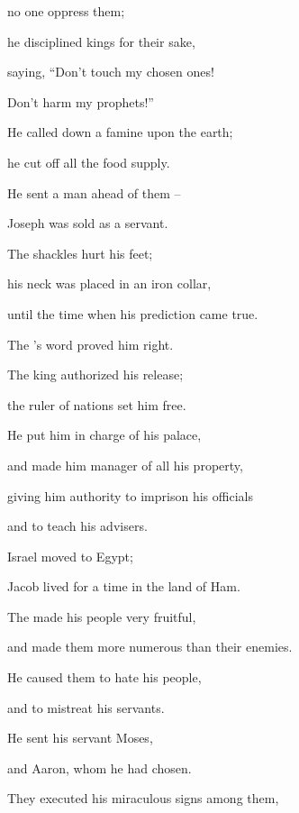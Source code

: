 {no
one
oppress
them;
\par }{\Q he disciplined
kings
for their sake,
\par }{\Q {}saying, “Don’t
touch
my chosen ones!
\par }{\Q Don’t
harm
my prophets!”
\par }{\Q {}He called
down a famine
upon
the earth;
\par }{\Q he cut off
all
the food
supply.
\par }{\Q {}He sent
a man
ahead of them –
\par }{\Q Joseph was sold as a servant.
\par }{\Q {}The shackles
hurt
his feet;
\par }{\Q his neck was placed
in an iron
collar,
\par }{\Q {}until
the time
when his prediction
came
true.
\par }{\Q The
{}’s
word
proved him right.
\par }{\Q {}The king
authorized
his release;
\par }{\Q the ruler
of nations
set him free.
\par }{\Q {}He put
him
in charge of his palace,
\par }{\Q and made him manager
of all
his property,
\par }{\Q {}giving him authority to imprison
his officials
\par }{\Q and to teach his advisers.
\par }{\Q {}Israel
moved
to Egypt;
\par }{\Q Jacob
lived
for a time in the land
of Ham.
\par }{\Q {}The
{} made his people
very
fruitful,
\par }{\Q and made them more numerous
than their enemies.
\par }{\Q {}He caused
them to hate
his people,
\par }{\Q and to mistreat
his servants.
\par }{\Q {}He sent
his servant
Moses,
\par }{\Q and Aaron,
whom
he had chosen.
\par }{\Q {}They executed
his miraculous
signs
among them,

}
